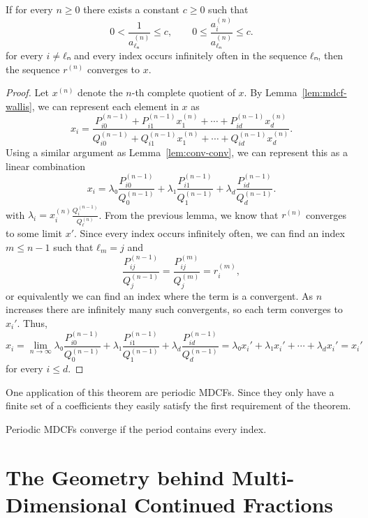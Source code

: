 \begin{theorem}
  \label{thm:mdcf-conv}
  If for every $n ≥ 0$ there exists a constant $c ≥ 0$ such that
  \[
    0 < \frac{1}{a^{(n)}_{ℓₙ}} ≤ c, \qquad 0 ≤ \frac{a^{(n)}_i}{a^{(n)}_{ℓₙ}} ≤ c.
  \]
  for every $i ≠ ℓₙ$ and every index occurs infinitely often in the sequence $ℓₙ$,
  then the sequence $r^{(n)}$ converges to $x$.
\end{theorem}

\begin{proof}
  Let $x^{(n)}$ denote the $n$-th complete quotient of $x$.
  By Lemma~\ref{lem:mdcf-wallis}, we can represent each element in $x$ as
  \[
    x_i = \frac{P_{i0}^{(n-1)} + P_{i1}^{(n-1)} x_1^{(n)} + ⋯ + P_{id}^{(n-1)} x_d^{(n)}}{Q_{i0}^{(n-1)} + Q_{i1}^{(n-1)} x_1^{(n)} + ⋯ + Q_{id}^{(n-1)} x_d^{(n)}}.
  \]
  Using a similar argument as Lemma~\ref{lem:conv-conv}, we can represent this
  as a linear combination
  \[
    x_i = λ₀ \frac{P_{i0}^{(n-1)}}{Q_0^{(n-1)}}  + λ₁ \frac{P_{i1}^{(n-1)}}{Q_1^{(n-1)}} + λ_d \frac{P_{id}^{(n-1)}}{Q_d^{(n-1)}}.
  \]
  with $λ_i = x_i^{(n)} \frac{Q_i^{(n-1)}}{Q_ℓ^{(n)}}$.
  From the previous lemma, we know that $r^{(n)}$ converges to some limit $x'$.
  Since every index occurs infinitely often,
  we can find an index $m ≤ n - 1$ such that $ℓ_m = j$ and
  \[
    \frac{P_{ij}^{(n-1)}}{Q_j^{(n-1)}} = \frac{P_{ij}^{(m)}}{Q_j^{(m)}} = r_i^{(m)},
  \]
  or equivalently we can find an index where the term is a convergent.
  As $n$ increases there are infinitely many such convergents,
  so each term converges to $x_i'$.
  Thus,
  \[
    x_i
    = \lim_{n → ∞} λ₀ \frac{P_{i0}^{(n-1)}}{Q_0^{(n-1)}}  + λ₁ \frac{P_{i1}^{(n-1)}}{Q_1^{(n-1)}} + λ_d \frac{P_{id}^{(n-1)}}{Q_d^{(n-1)}}
    = λ₀ x_i' + λ₁ x_i' + ⋯ + λ_d x_i'
    = x_i'
  \]
  for every $i ≤ d$.
\end{proof}

One application of this theorem are periodic MDCFs.
Since they only have a finite set of a coefficients they easily satisfy the
first requirement of the theorem.

\begin{corollary}
  Periodic MDCFs converge if the period contains every index.
\end{corollary}

\section{The Geometry behind Multi-Dimensional Continued Fractions}

